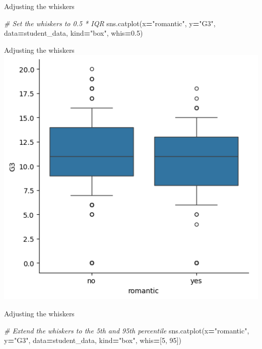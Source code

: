 \documentclass[
  ignorenonframetext,
]{beamer}
\newenvironment{Shaded}{\begin{snugshade}}{\end{snugshade}}
\newcommand{\CommentTok}[1]{\textcolor[rgb]{0.56,0.35,0.01}{\textit{#1}}}
\newcommand{\DecValTok}[1]{\textcolor[rgb]{0.00,0.00,0.81}{#1}}
\newcommand{\FloatTok}[1]{\textcolor[rgb]{0.00,0.00,0.81}{#1}}
\newcommand{\NormalTok}[1]{#1}
\newcommand{\OperatorTok}[1]{\textcolor[rgb]{0.81,0.36,0.00}{\textbf{#1}}}
\newcommand{\StringTok}[1]{\textcolor[rgb]{0.31,0.60,0.02}{#1}}
\begin{document}
\begin{frame}[fragile]{Adjusting the whiskers}
\label{adjusting-the-whiskers-3}

\begin{Shaded}
\begin{Highlighting}[]
\CommentTok{\# Set the whiskers to 0.5 * IQR}
\NormalTok{sns.catplot(x}\OperatorTok{=}\StringTok{"romantic"}\NormalTok{, y}\OperatorTok{=}\StringTok{"G3"}\NormalTok{,}
\NormalTok{            data}\OperatorTok{=}\NormalTok{student\_data,}
\NormalTok{            kind}\OperatorTok{=}\StringTok{"box"}\NormalTok{,}
\NormalTok{            whis}\OperatorTok{=}\FloatTok{0.5}\NormalTok{)}
\end{Highlighting}
\end{Shaded}
\end{frame}

\begin{frame}{Adjusting the whiskers}
\label{adjusting-the-whiskers-4}
\includegraphics{../images/im287.png}
\end{frame}

\begin{frame}[fragile]{Adjusting the whiskers}
\label{adjusting-the-whiskers-5}

\begin{Shaded}
\begin{Highlighting}[]
\CommentTok{\# Extend the whiskers to the 5th and 95th percentile}
\NormalTok{sns.catplot(x}\OperatorTok{=}\StringTok{"romantic"}\NormalTok{, y}\OperatorTok{=}\StringTok{"G3"}\NormalTok{,}
\NormalTok{            data}\OperatorTok{=}\NormalTok{student\_data,}
\NormalTok{            kind}\OperatorTok{=}\StringTok{"box"}\NormalTok{,}
\NormalTok{            whis}\OperatorTok{=}\NormalTok{[}\DecValTok{5}\NormalTok{, }\DecValTok{95}\NormalTok{])}
\end{Highlighting}
\end{Shaded}
\end{frame}
\end{document}
